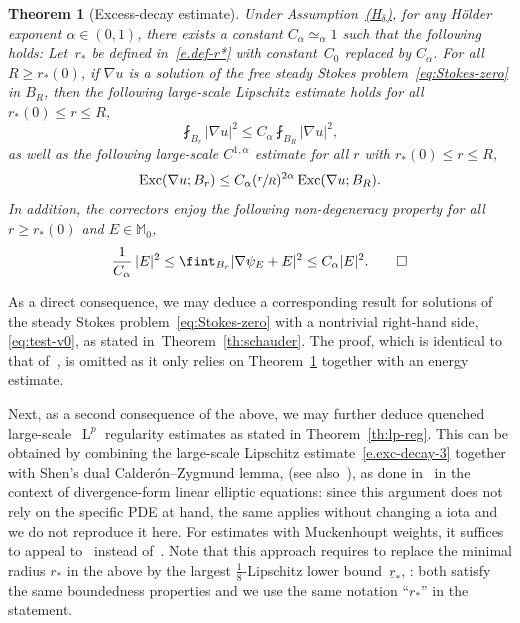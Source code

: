 \documentclass[10pt]{amsart}
\newcommand{\Hd}{\hyperref[Hd]{\textup{(H$_\delta$)}}\xspace}
\theoremstyle{plain}
\newtheorem{theor}{Theorem}[section]
\theoremstyle{definition}
\newcommand{\Exc}{\operatorname{Exc}}
\newcommand{\Md}{\mathbb M}
\newcommand{\Ld}{\operatorname{L}}
\begin{document}
\begin{theor}[Excess-decay estimate]\label{th:excess-decay}
Under Assumption~\Hd, for any Hölder exponent $\alpha \in (0,1)$, there exists a constant $C_\alpha\simeq_\alpha1$ such that the following holds: Let~$r_*$ be defined in~\eqref{e.def-r*} with constant~$C_0$ replaced by $C_\alpha$.
For all $R\ge r_*(0)$, if $\nabla u$ is a solution of the free steady Stokes problem~\eqref{eq:Stokes-zero} in $B_R$,
then the following large-scale Lipschitz estimate holds for all $r_*(0)\le r\le R$,
\begin{equation}\label{e.exc-decay-3}
\fint_{B_r} |\nabla u|^2 \le C_\alpha \fint_{B_R}|\nabla u|^2,
\end{equation}
as well as the following large-scale $C^{1,\alpha}$ estimate for all $r$ with  $r_*(0)\le r\le R$,
\begin{equation*}
\Exc(\nabla u;B_r)\le C_\alpha (\sfrac r R)^{2\alpha} \Exc(\nabla u;B_R).
\end{equation*}
In addition, the correctors enjoy the following non-degeneracy property for all $r\ge r_*(0)$ and $E\in\Md_0$,
\begin{equation*}
\frac1{C_\alpha}\, |E|^2 \le \fint_{B_r} |\nabla \psi_E+E|^2 \le C_\alpha |E|^2.\qedhere
\end{equation*}
\end{theor}

As a direct consequence, we may deduce a corresponding result for solutions of the steady Stokes problem~\eqref{eq:Stokes-zero} with a nontrivial right-hand side, \cf \eqref{eq:test-v0}, as stated in~Theorem~\ref{th:schauder}.
The proof, which is identical to that of~\cite[Cor.\,3]{GNO-reg}, is omitted as it only relies on Theorem~\ref{th:excess-decay} together with an energy estimate.

Next, as a second consequence of the above, we may further deduce quenched large-scale~$\Ld^p$ regularity estimates as stated in Theorem~\ref{th:lp-reg}.
This can be obtained by combining the large-scale Lipschitz estimate~\eqref{e.exc-decay-3} together with Shen's dual Calderón--Zygmund lemma, \cf \cite[Th.\,3.2]{Shen-07} (see also~\cite[Th.\,2.4]{Shen-12}), as done in~\cite[\S 6.1]{DO1} in the context of divergence-form linear elliptic equations: since this argument does not rely on the specific PDE at hand, the same applies without changing a iota and we do not reproduce it here. For estimates with Muckenhoupt weights, it suffices to appeal to~\cite[Th.\,3.4 \& Rem.\,3.5]{Shen-07} instead of~\cite[Th.\,3.2]{Shen-07}.
Note that this approach requires to replace the minimal radius $r_*$ in the above by the largest $\frac18$-Lipschitz lower bound~$\underline r_*$, \cf \cite[\S 3.7]{GNO-reg}: both satisfy the same boundedness properties and we use the same notation ``$r_*$'' in the statement.
\end{document}

